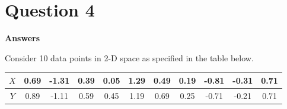 \section*{Question 4}

\textbf{Answers}

Consider 10 data points in 2-D space as specified in the table below. 
\begin{table}[htb]
\begin{center}
\begin{tabular}{|c|c|c|c|c|c|c|c|c|c|c|} \hline
 $X$ & 0.69 & -1.31 & 0.39 & 0.05 & 1.29 & 0.49 & 0.19 & -0.81 & -0.31 & 0.71  \\ \hline 
 $Y$ & 0.89 & -1.11 & 0.59 & 0.45 & 1.19 & 0.69 & 0.25 & -0.71 & -0.21 & 0.71  \\ \hline
\end{tabular}
\end{center}
\end{table}
